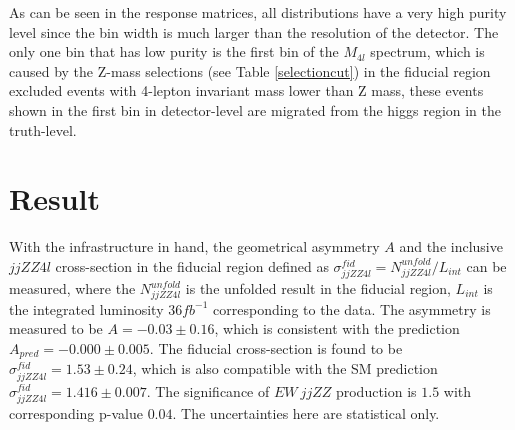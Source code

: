 \documentclass[12pt]{article}
\begin{document}
            \par As can be seen in the response matrices, all distributions have a very high purity level since the bin 
            width is much larger than the resolution of the detector. The only one bin that has low purity is the first 
            bin of the $M_{4l}$ spectrum, which is caused by the Z-mass selections (see Table \ref{selectioncut}) in 
            the fiducial region excluded events with 4-lepton invariant mass lower than Z mass, these events shown in 
            the first bin in detector-level are migrated from the higgs region in the truth-level.
    \section{Result}
        \par With the infrastructure in hand, the geometrical asymmetry $A$ and the inclusive $jjZZ4l$ cross-section in the 
        fiducial region defined as $\sigma^{fid}_{jjZZ4l} = N^{unfold}_{jjZZ4l}/ L_{int}$ can be measured, where the $N^{unfold}_{jjZZ4l}$ 
        is the unfolded result in the fiducial region, $L_{int}$ is the integrated luminosity $36fb^{-1}$ corresponding to 
        the data. The asymmetry is measured to be $A = -0.03 \pm 0.16$, which is consistent with the prediction $A_{pred} = -0.000 \pm 0.005$. 
        The fiducial cross-section is found to be $\sigma^{fid}_{jjZZ4l} = 1.53 \pm 0.24$, which is also compatible with the 
        SM prediction $\sigma^{fid}_{jjZZ4l} = 1.416 \pm 0.007$. The significance of $EW\ jjZZ$ production is $1.5$ with corresponding p-value $0.04$.
        The uncertainties here are statistical only.
\end{document}

